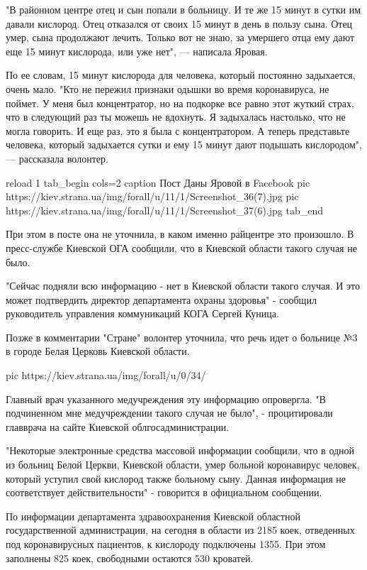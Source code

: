 "В районном центре отец и сын попали в больницу. И те же 15 минут в сутки
им давали кислород. Отец отказался от своих 15 минут в день в пользу сына.
Отец умер, сына продолжают лечить. Только вот не знаю, за умершего отца
ему дают еще 15 минут кислорода, или уже нет", — написала Яровая.

По ее словам, 15 минут кислорода для человека, который постоянно
задыхается, очень мало. "Кто не пережил признаки одышки во время
коронавируса, не поймет. У меня был концентратор, но на подкорке все равно
этот жуткий страх, что в следующий раз ты можешь не вдохнуть. Я задыхалась
настолько, что не могла говорить. И еще раз, это я была с концентратором.
А теперь представьте человека, который задыхается сутки и ему 15 минут
дают подышать кислородом", — рассказала волонтер.

\ifcmt
reload 1
tab_begin cols=2
	caption Пост Даны Яровой в Facebook
	pic https://kiev.strana.ua/img/forall/u/11/1/Screenshot_36(7).jpg
	pic https://kiev.strana.ua/img/forall/u/11/1/Screenshot_37(6).jpg
tab_end
\fi

При этом в посте она не уточнила, в каком именно райцентре это произошло.
В пресс-службе Киевской ОГА сообщили, что в Киевской области такого случая
не было.

"Сейчас подняли всю информацию - нет в Киевской области такого случая. И
это может подтвердить директор департамента охраны здоровья" - сообщил
руководитель управления коммуникаций КОГА Сергей Куница.

Позже в комментарии "Стране" волонтер уточнила, что речь идет о больнице
№3 в городе Белая Церковь Киевской области.

\ifcmt
pic https://kiev.strana.ua/img/forall/u/0/34/%
\fi

Главный врач указанного медучреждения эту информацию опровергла. "В
подчиненном мне медучреждении такого случая не было", -  процитировали
главврача на сайте Киевской облгосадминистрации.

"Некоторые электронные средства массовой информации сообщили, что в одной
из больниц Белой Церкви, Киевской области, умер больной коронавирус
человек, который уступил свой кислород также больному сыну. Данная
информация не соответствует действительности" - говорится в официальном
сообщении.

По информации департамента здравоохранения Киевской областной
государственной администрации, на сегодня в области из 2185 коек,
отведенных под коронавирусных пациентов, к кислороду подключены 1355. При
этом заполнены 825 коек, свободными остаются 530 кроватей.


